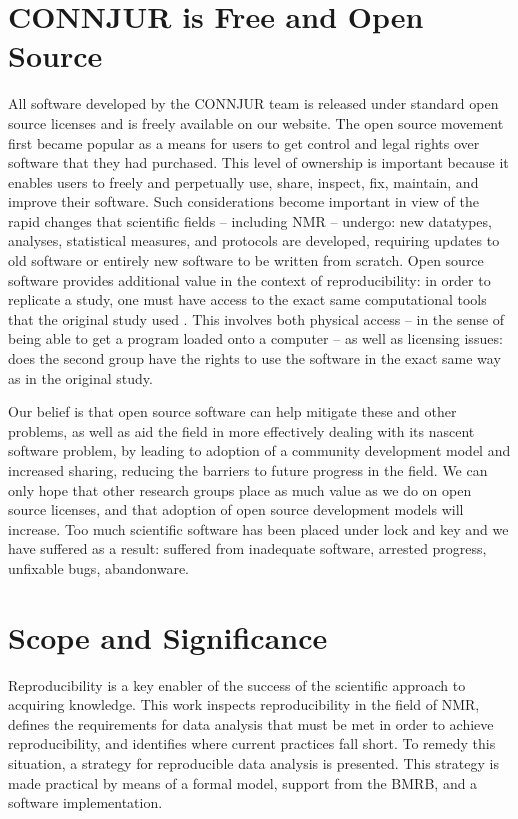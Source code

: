 \section{CONNJUR is Free and Open Source}
All software developed by the CONNJUR team is released under standard open 
source licenses and is freely available on our website.  The open source 
movement first became popular as a means for users to get control and legal 
rights over software that they had purchased.  This level of ownership is 
important because it enables users to freely and perpetually use, share, 
inspect, fix, maintain, and improve their software.  Such considerations 
become important in view of the rapid changes that scientific fields -- 
including NMR -- undergo: new datatypes, analyses, statistical measures, 
and protocols are developed, requiring updates to old software or entirely 
new software to be written from scratch.  Open source software provides 
additional value in the context of reproducibility: in order to replicate a
study, one must have access to the exact same computational tools that the 
original study used \cite{ince2012open}.  
This involves both physical access -- in the sense of 
being able to get a program loaded onto a computer -- as well as licensing 
issues: does the second group have the rights to use the software in the 
exact same way as in the original study.

Our belief is that open source software can help mitigate these and other 
problems, as well as aid the field in more effectively dealing with its 
nascent software problem, by leading to adoption of a community development 
model and increased sharing, reducing the barriers to future progress in 
the field.  We can only hope that other research groups place as much value 
as we do on open source licenses, and that adoption of open source development 
models will increase.  Too much scientific software has been placed under lock 
and key and we have suffered as a result: suffered from inadequate software, 
arrested progress, unfixable bugs, abandonware.


\section{Scope and Significance}
Reproducibility is a key enabler of the success of the scientific approach to 
acquiring knowledge.  This work inspects reproducibility in the field of NMR, 
defines the requirements for data analysis that must be met in order to achieve 
reproducibility, and identifies where current practices fall short.  To remedy 
this situation, a strategy for reproducible data analysis is presented.  This 
strategy is made practical by means of a formal model, support from the BMRB, 
and a software implementation.

